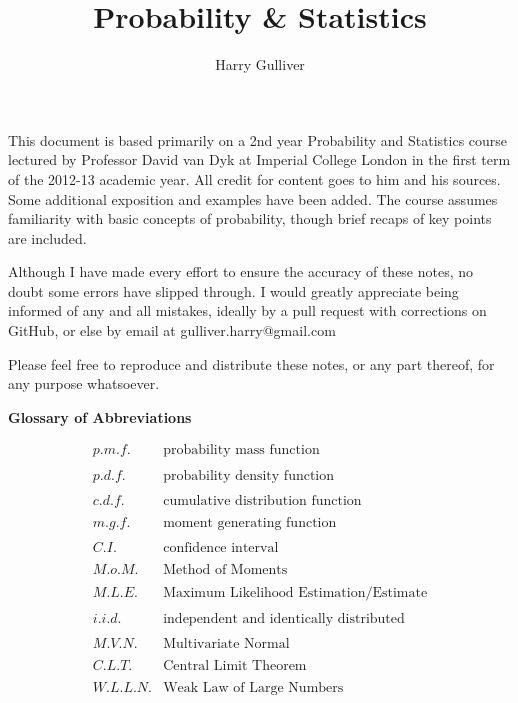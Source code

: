 \documentclass[12pt,a4paper]{article}
\title{Probability \& Statistics}
\author{Harry Gulliver}
\date{}
\begin{document}
\maketitle
{}
\pagestyle{fancyplain}

\cfoot{\thepage}



This document is based primarily on a 2nd year Probability and Statistics course lectured by Professor David van Dyk at Imperial College London in the first term of the 2012-13 academic year. All credit for content goes to him and his sources. Some additional exposition and examples have been added. The course assumes familiarity with basic concepts of probability, though brief recaps of key points are included.

Although I have made every effort to ensure the accuracy of these notes, no doubt some errors have slipped through. I would greatly appreciate being informed of any and all mistakes, ideally by a pull request with corrections on GitHub, or else by email at gulliver.harry@gmail.com

Please feel free to reproduce and distribute these notes, or any part thereof, for any purpose whatsoever.






\tableofcontents
\vspace{50pt}

{\Large \textbf{Glossary of Abbreviations}}  %
\vspace{12pt}

$$\begin{array}{lr}
p.m.f. & \mbox{probability mass function}\\
 & \\
p.d.f. & \mbox{probability density function}\\
 & \\
c.d.f. & \mbox{cumulative distribution function}\\
 & \\
m.g.f. & \mbox{moment generating function}\\
 & \\
C.I. & \mbox{confidence interval}\\
 & \\
M.o.M. & \mbox{Method of Moments}\\
 & \\
M.L.E. & \mbox{Maximum Likelihood Estimation/Estimate}\\
 & \\
i.i.d. & \mbox{independent and identically distributed}\\
 & \\
M.V.N. & \mbox{Multivariate Normal}\\
 & \\
C.L.T. & \mbox{Central Limit Theorem}\\
 & \\
W.L.L.N. & \mbox{Weak Law of Large Numbers}
\end{array}$$
\end{document}
